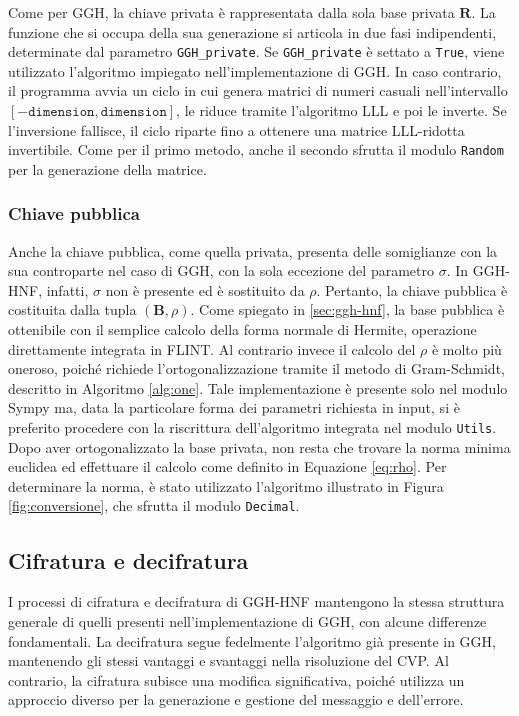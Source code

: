 Come per GGH, la chiave privata è rappresentata dalla sola base privata $\mathbf{R}$.
La funzione che si occupa della sua generazione si articola in due fasi indipendenti, 
determinate dal parametro \texttt{GGH\_private}. Se \texttt{GGH\_private}
è settato a \texttt{True}, viene utilizzato l'algoritmo impiegato nell'implementazione di GGH.
In caso contrario, il programma avvia un ciclo in cui genera matrici di numeri casuali 
nell'intervallo $[-\texttt{dimension},\texttt{dimension}]$, le riduce tramite l'algoritmo 
LLL e poi le inverte. Se l'inversione fallisce, il ciclo riparte fino a ottenere una 
matrice LLL-ridotta invertibile. 
Come per il primo metodo, anche il secondo sfrutta il modulo \texttt{Random} per la 
generazione della matrice.

\subsubsection{Chiave pubblica}

Anche la chiave pubblica, come quella privata, presenta delle somiglianze con la sua 
controparte nel caso di GGH, con la sola eccezione del parametro $\sigma$. 
In GGH-HNF, infatti, $\sigma$ non è presente ed è sostituito da $\rho$. 
Pertanto, la chiave pubblica è costituita dalla tupla $(\mathbf{B}, \rho)$. Come spiegato
in \ref{sec:ggh-hnf}, la base pubblica è ottenibile con il semplice calcolo della forma
normale di Hermite, operazione direttamente integrata in FLINT. Al contrario invece il 
calcolo del $\rho$ è molto più oneroso, poiché richiede l'ortogonalizzazione tramite il 
metodo di Gram-Schmidt, descritto in Algoritmo \ref{alg:one}. Tale implementazione è 
presente solo nel modulo Sympy ma, data la particolare forma dei parametri richiesta in input, 
si è preferito procedere con la riscrittura dell'algoritmo integrata nel modulo \texttt{Utils}.
Dopo aver ortogonalizzato la base privata, non resta che trovare la norma minima euclidea 
ed effettuare il calcolo come definito in Equazione \ref{eq:rho}. 
Per determinare la norma, è stato utilizzato l'algoritmo illustrato in Figura 
\ref{fig:conversione}, che sfrutta il modulo \texttt{Decimal}.

\subsection{Cifratura e decifratura}

I processi di cifratura e decifratura di GGH-HNF mantengono la stessa struttura generale 
di quelli presenti nell'implementazione di GGH, con alcune differenze fondamentali. 
La decifratura segue 
fedelmente l'algoritmo già presente in GGH, mantenendo gli stessi vantaggi e svantaggi
nella risoluzione del CVP. Al contrario, la cifratura subisce una modifica significativa, 
poiché utilizza un approccio diverso per la generazione e gestione del messaggio e 
dell'errore.

